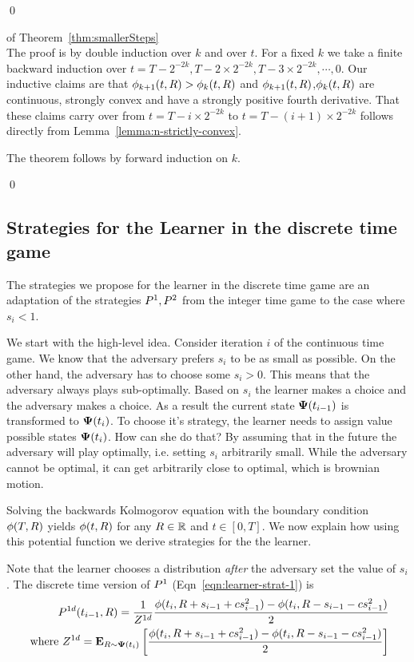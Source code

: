 \documentclass{article}[12pt]
\begin{document}
\qed

\proof  of Theorem~\ref{thm:smallerSteps} \\
The proof is by double induction over $k$ and over $t$.
For a fixed $k$ we take a finite backward induction over
$t=T-2^{-2k},T-2 \times 2^{-2k},T-3 \times 2^{-2k},\cdots,0$.
Our inductive claims are that $\phi_{k+1}(t,R) > \phi_{k}(t,R)$ and
$\phi_{k+1}(t,R)$,$\phi_{k}(t,R)$ are continuous, strongly convex and
have a strongly positive fourth derivative. That these claims carry over
from $t=T-i \times 2^{-2k}$ to  $t=T-(i+1) \times 2^{-2k}$ follows
directly from Lemma~\ref{lemma:n-strictly-convex}.

The theorem follows by forward induction on $k$.

\qed

\subsection{Strategies for the Learner in the discrete time game}
The strategies we propose for the learner in the discrete time game
are an adaptation of the strategies $P^1,P^2$ from the
integer time game to the case where $s_i<1$.

We start with the high-level idea. Consider iteration $i$ of the
continuous time game. We know that the adversary prefers $s_i$ to be
as small as possible. On the other hand, the adversary has to choose
some $s_i>0$. This means that the adversary always plays
sub-optimally. Based on $s_i$ the learner makes a choice and the
adversary makes a choice. As a result the current state ${\bf \Psi}(t_{i-1})$
is transformed to ${\bf \Psi}(t_i)$. To choose it's strategy, the learner
needs to assign value possible states ${\bf \Psi}(t_i)$. How can she do
that? By assuming that in the future the adversary will play
optimally, i.e. setting $s_i$ arbitrarily small. While the adversary
cannot be optimal, it can get arbitrarily close to optimal, which is
brownian motion.

Solving the backwards Kolmogorov equation with the boundary condition
$\phi(T,R)$ yields $\phi(t,R)$ for any
$R \in \mathbb{R}$ and $t \in [0,T]$. We now explain how using this
potential function we derive strategies for the the learner. 

Note that the learner chooses a distribution {\em after} the adversary
set the value of $s_i$. The discrete time version of $P^1$
(Eqn~\ref{eqn:learner-strat-1}) is 
\begin{eqnarray} \label{eqn:learner-strat-1c}
  P^{1d}(t_{i-1},R) = \frac{1}{Z^{1d}}
  \frac{\phi(t_i,R+s_{i-1}+cs_{i-1}^2) -
  \phi(t_i,R-s_{i-1}-cs_{i-1}^2)}{2} \\
  \mbox{ where } Z^{1d} = {\bf E}_{R \sim {\bf \Psi}(t_i)}\left[ \frac{\phi(t_i,R+s_{i-1}+cs_{i-1}^2) -
  \phi(t_i,R-s_{i-1}-cs_{i-1}^2)}{2} \right] \nonumber
\end{eqnarray}
\end{document}
